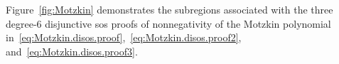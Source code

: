 \documentclass[12pt]{article}
\theoremstyle{remark}
\begin{document}
Figure~\ref{fig:Motzkin} demonstrates the subregions associated with the three degree-6 disjunctive sos proofs of nonnegativity of the Motzkin polynomial in~\eqref{eq:Motzkin.disos.proof},~\eqref{eq:Motzkin.disos.proof2}, and~\eqref{eq:Motzkin.disos.proof3}.


\end{document}
